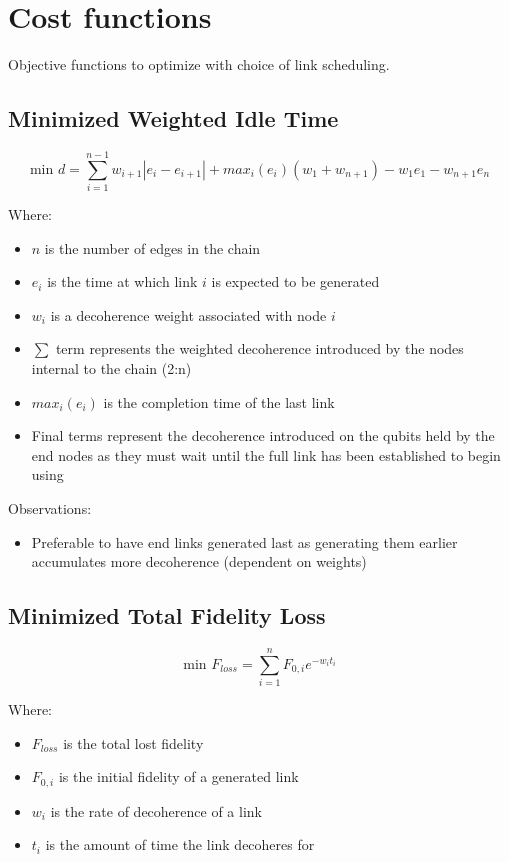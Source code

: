 \documentclass{article}
\begin{document}
\section{Cost functions}
Objective functions to optimize with choice of link scheduling.

\subsection{Minimized Weighted Idle Time}

    $$\text{min } d = \sum_{i=1}^{n-1} w_{i+1}|e_i - e_{i+1}| + max_i(e_i)(w_1 + w_{n+1}) - w_1e_1 - w_{n+1}e_n$$

Where:
\begin{itemize}
    \item $n$ is the number of edges in the chain
    \item $e_i$ is the time at which link $i$ is expected to be generated
    \item $w_i$ is a decoherence weight associated with node $i$
    \item $\sum$ term represents the weighted decoherence introduced by the nodes internal to the chain (2:n)
    \item $max_i(e_i)$ is the completion time of the last link
    \item Final terms represent the decoherence introduced on the qubits held by the end nodes as they must wait until the full link has been established to begin using
\end{itemize}

Observations:
\begin{itemize}
    \item Preferable to have end links generated last as generating them earlier accumulates more decoherence (dependent on weights)
\end{itemize}

\subsection{Minimized Total Fidelity Loss}

$$\text{min } F_{loss} = \sum_{i=1}^{n} F_{0,i}e^{-w_it_i}$$

Where:
\begin{itemize}
    \item $F_{loss}$ is the total lost fidelity
    \item $F_{0,i}$ is the initial fidelity of a generated link
    \item $w_i$ is the rate of decoherence of a link
    \item $t_i$ is the amount of time the link decoheres for
\end{itemize}
\end{document}
